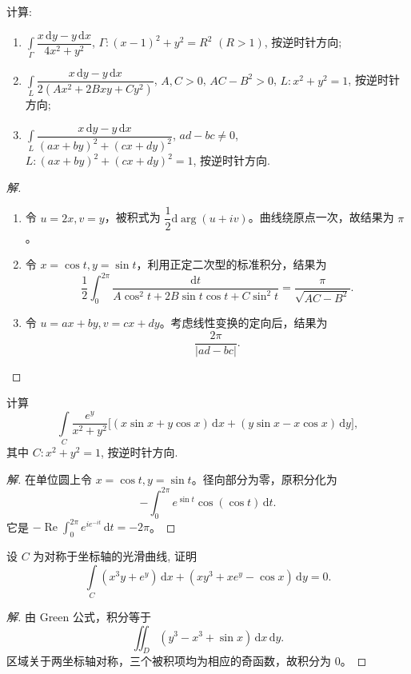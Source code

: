 \documentclass[../../数学分析培优讲义(答案版).tex]{subfiles}
\begin{document}
\begin{example}
计算:
\begin{enumerate}[label=(\arabic*)]
    \item $\displaystyle\int\limits_\Gamma\dfrac{x\,\mathrm{d}y-y\,\mathrm{d}x}{4x^2+y^2}$, $\Gamma:(x-1)^2+y^2=R^2$ $(R>1)$, 按逆时针方向;
    \item $\displaystyle\int\limits_L\dfrac{x\,\mathrm{d}y-y\,\mathrm{d}x}{2(Ax^2+2Bxy+Cy^2)}$, $A,C>0$, $AC-B^2>0$, $L:x^2+y^2=1$, 按逆时针方向;
    \item $\displaystyle\int\limits_L\dfrac{x\,\mathrm{d}y-y\,\mathrm{d}x}{(ax+by)^2+(cx+dy)^2}$, $ad-bc\ne0$, $L:(ax+by)^2+(cx+dy)^2=1$, 按逆时针方向.
\end{enumerate}
\end{example}

\begin{proof}[解]
\begin{enumerate}[label=(\arabic*)]
\item 令 $u=2x,v=y$，被积式为 $\dfrac{1}{2}\mathrm{d}\arg(u+iv)$。曲线绕原点一次，故结果为 $\pi$。
\item 令 $x=\cos t,y=\sin t$，利用正定二次型的标准积分，结果为
\[
\dfrac{1}{2}\int_0^{2\pi}\dfrac{\mathrm{d}t}{A\cos^2t+2B\sin t\cos t+C\sin^2t}
=\dfrac{\pi}{\sqrt{AC-B^2}}.
\]
\item 令 $u=ax+by,v=cx+dy$。考虑线性变换的定向后，结果为
\[
\dfrac{2\pi}{|ad-bc|}.
\]
\end{enumerate}
\end{proof}

\begin{example}
计算
\[
    \int\limits_C\dfrac{e^y}{x^2+y^2}
    \bigl\lbrack (x\sin x+y\cos x)\,\mathrm{d}x+(y\sin x-x\cos x)\,\mathrm{d}y\bigr\rbrack,
\]
其中 $C:x^2+y^2=1$, 按逆时针方向.
\end{example}

\begin{proof}[解]
在单位圆上令 $x=\cos t,y=\sin t$。径向部分为零，原积分化为
\[
-\int_0^{2\pi}e^{\sin t}\cos(\cos t)\,\mathrm{d}t.
\]
它是 $-\operatorname{Re}\int_0^{2\pi}e^{i e^{-it}}\,\mathrm{d}t=-2\pi$。
\end{proof}

\begin{example}
设 $C$ 为对称于坐标轴的光滑曲线, 证明
\[
    \int\limits_C(x^3y+e^y)\,\mathrm{d}x+(xy^3+xe^y-\cos x)\,\mathrm{d}y=0.
\]
\end{example}

\begin{proof}[解]
由 Green 公式，积分等于
\[
\iint_D(y^3-x^3+\sin x)\,\mathrm{d}x\,\mathrm{d}y.
\]
区域关于两坐标轴对称，三个被积项均为相应的奇函数，故积分为 $0$。
\end{proof}
\end{document}
